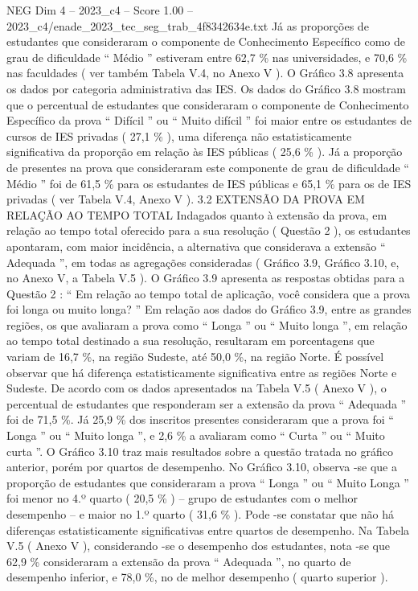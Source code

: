 \begin{textsample}{NEG Dim 4 – 2023\_c4 – Score 1.00 – 2023\_c4/enade\_2023\_tec\_seg\_trab\_4f8342634e.txt}
Já as proporções de estudantes que consideraram o componente de Conhecimento Específico como de grau de dificuldade “ Médio ” estiveram entre 62,7 \% nas universidades, e 70,6 \% nas faculdades ( ver também Tabela V.4, no Anexo V ).
O Gráfico 3.8 apresenta os dados por categoria administrativa das IES.
Os dados do Gráfico 3.8 mostram que o percentual de estudantes que consideraram o componente de Conhecimento Específico da prova “ Difícil ” ou “ Muito difícil ” foi maior entre os estudantes de cursos de IES privadas ( 27,1 \% ), uma diferença não estatisticamente significativa da proporção em relação às IES públicas ( 25,6 \% ).
Já a proporção de presentes na prova que consideraram este componente de grau de dificuldade “ Médio ” foi de 61,5 \% para os estudantes de IES públicas e 65,1 \% para os de IES privadas ( ver Tabela V.4, Anexo V ). 3.2 EXTENSÃO DA PROVA EM RELAÇÃO AO TEMPO TOTAL Indagados quanto à extensão da prova, em relação ao tempo total oferecido para a sua resolução ( Questão 2 ), os estudantes apontaram, com maior incidência, a alternativa que considerava a extensão “ Adequada ”, em todas as agregações consideradas ( Gráfico 3.9, Gráfico 3.10, e, no Anexo V, a Tabela V.5 ).
O Gráfico 3.9 apresenta as respostas obtidas para a Questão 2 : “ Em relação ao tempo total de aplicação, você considera que a prova foi longa ou muito longa? ” Em relação aos dados do Gráfico 3.9, entre as grandes regiões, os que avaliaram a prova como “ Longa ” ou “ Muito longa ”, em relação ao tempo total destinado a sua resolução, resultaram em porcentagens que variam de 16,7 \%, na região Sudeste, até 50,0 \%, na região Norte.
É possível observar que há diferença estatisticamente significativa entre as regiões Norte e Sudeste.
De acordo com os dados apresentados na Tabela V.5 ( Anexo V ), o percentual de estudantes que responderam ser a extensão da prova “ Adequada ” foi de 71,5 \%.
Já 25,9 \% dos inscritos presentes consideraram que a prova foi “ Longa ” ou “ Muito longa ”, e 2,6 \% a avaliaram como “ Curta ” ou “ Muito curta ”.
O Gráfico 3.10 traz mais resultados sobre a questão tratada no gráfico anterior, porém por quartos de desempenho.
No Gráfico 3.10, observa -se que a proporção de estudantes que consideraram a prova “ Longa ” ou “ Muito Longa ” foi menor no 4.º quarto ( 20,5 \% ) – grupo de estudantes com o melhor desempenho – e maior no 1.º quarto ( 31,6 \% ).
Pode -se constatar que não há diferenças estatisticamente significativas entre quartos de desempenho.
Na Tabela V.5 ( Anexo V ), considerando -se o desempenho dos estudantes, nota -se que 62,9 \% consideraram a extensão da prova “ Adequada ”, no quarto de desempenho inferior, e 78,0 \%, no de melhor desempenho ( quarto superior ).

\end{textsample}
